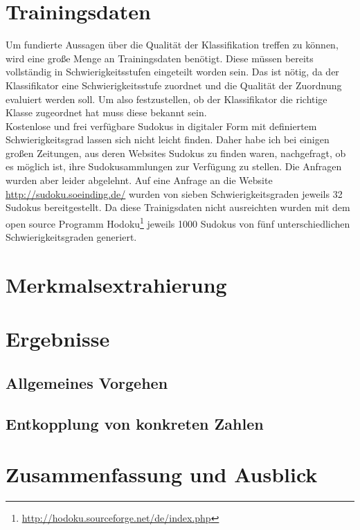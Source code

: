 \documentclass[accentcolor=tud6b,11pt,paper=a4]{tudreport}
\begin{document}
\chapter{Trainingsdaten}
Um fundierte Aussagen über die Qualität der Klassifikation treffen zu können, wird eine große Menge an Trainingsdaten benötigt. Diese müssen bereits vollständig in Schwierigkeitsstufen eingeteilt worden sein. Das ist nötig, da der Klassifikator eine Schwierigkeitsstufe zuordnet und die Qualität der Zuordnung evaluiert werden soll. Um also festzustellen, ob der Klassifikator die richtige Klasse zugeordnet hat muss diese bekannt sein.\\
Kostenlose und frei verfügbare Sudokus in digitaler Form mit definiertem Schwierigkeitsgrad lassen sich nicht leicht finden. Daher habe ich bei einigen großen Zeitungen, aus deren Websites Sudokus zu finden waren, nachgefragt, ob es möglich ist, ihre Sudokusammlungen zur Verfügung zu stellen. Die Anfragen wurden aber leider abgelehnt. Auf eine Anfrage an die Website \url{http://sudoku.soeinding.de/} wurden von sieben Schwierigkeitsgraden jeweils 32 Sudokus bereitgestellt. Da diese Trainigsdaten nicht ausreichten wurden mit dem open source Programm Hodoku\footnote{\url{http://hodoku.sourceforge.net/de/index.php}} jeweils 1000 Sudokus von fünf unterschiedlichen Schwierigkeitsgraden generiert.
\chapter{Merkmalsextrahierung}
\chapter{Ergebnisse}
\section{Allgemeines Vorgehen}
\section{Entkopplung von konkreten Zahlen}

\chapter{Zusammenfassung und Ausblick}
\end{document}
